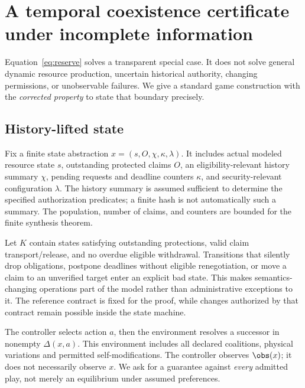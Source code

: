 \section{A temporal coexistence certificate under incomplete information}
\label{sec:game}
Equation~\eqref{eq:reserve} solves a transparent special case. It does not solve general dynamic resource production, uncertain historical authority, changing permissions, or unobservable failures. We give a standard game construction with the \emph{corrected property} to state that boundary precisely.

\subsection{History-lifted state}
Fix a finite state abstraction $x=(s,O,\chi,\kappa,\lambda)$. It includes actual modeled resource state $s$, outstanding protected claims $O$, an eligibility-relevant history summary $\chi$, pending requests and deadline counters $\kappa$, and security-relevant configuration $\lambda$. The history summary is assumed sufficient to determine the specified authorization predicates; a finite hash is not automatically such a summary. The population, number of claims, and counters are bounded for the finite synthesis theorem.

Let $K$ contain states satisfying outstanding protections, valid claim transport/release, and no overdue eligible withdrawal. Transitions that silently drop obligations, postpone deadlines without eligible renegotiation, or move a claim to an unverified target enter an explicit bad state. This makes semantics-changing operations part of the model rather than administrative exceptions to it. The reference contract is fixed for the proof, while changes authorized by that contract remain possible inside the state machine.

The controller selects action $a$, then the environment resolves a successor in nonempty $\Delta(x,a)$. This environment includes all declared coalitions, physical variations and permitted self-modifications. The controller observes $\obs(x)$; it does not necessarily observe $x$. We ask for a guarantee against \emph{every} admitted play, not merely an equilibrium under assumed preferences.

